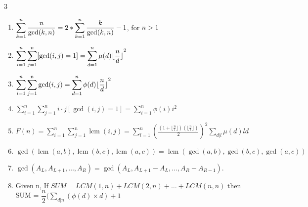 \documentclass[8pt,a4paper,onesided]{article}
\begin{document}
\begin{multicols}{3}
\begin{enumerate}[resume]
    \item $\displaystyle \displaystyle \sum_{k=1}^n \frac{n}{\gcd(k, n)} = 2 * \displaystyle \sum_{k=1}^n \frac{k}{\gcd(k, n)} - 1$, for $n > 1$
    \item $\displaystyle \displaystyle \sum_{i=1}^n \sum_{j=1}^n [\gcd(i, j) = 1] = \displaystyle \sum_{d=1}^n \mu(d) \lfloor {\frac{n}{d} \rfloor}^2$
    \item $\displaystyle \displaystyle \sum_{i=1}^n \displaystyle\sum_{j=1}^n \gcd(i, j) = \displaystyle \sum_{d=1}^n \phi(d) \lfloor {\frac{n}{d} \rfloor}^2$
    \item $\displaystyle \sum_{i=1}^n \sum_{j=1}^n i \cdot j[\gcd(i, j) = 1] = \sum_{i=1}^n \phi(i)i^2$
    \item $\displaystyle F(n) = \displaystyle \sum_{i=1}^n \displaystyle \sum_{j=1}^n \operatorname{lcm}(i, j) = \displaystyle \sum_{l=1}^n {\left(\frac{\left( 1 + \lfloor{\frac{n}{l} \rfloor} \right) \left( \lfloor{\frac{n}{l} \rfloor} \right)} {2} \right)}^2 \displaystyle \sum_{d|l} \mu(d)ld$
    \item $\displaystyle \gcd(\operatorname{lcm}(a, b), \operatorname{lcm}(b, c), \operatorname{lcm}(a, c)) = \operatorname{lcm}(\gcd(a, b), \gcd(b, c), \gcd(a, c))$
    \item $\displaystyle \gcd(A_L, A_{L+1}, \dots, A_R) = \gcd(A_L, A_{L+1} - A_L, \dots, A_R - A_{R-1})$.
    \item Given n, If $SUM = LCM(1,n) + LCM(2,n) + \dots + LCM(n,n)$
    then SUM = $\displaystyle \dfrac{n}{2}( \displaystyle\sum _{ d| n}\left( \phi \left( d\right) \times d\right) +1$
  \end{enumerate}

\end{multicols}
\end{document}
